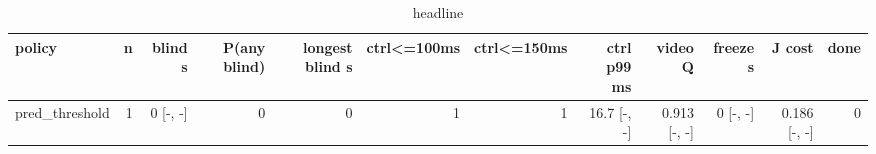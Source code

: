 \begin{table}[t]\centering\small
\begin{tabular}{lrrrrrrrrrrr}\toprule
policy & n & blind s & P(any blind) & longest blind s & ctrl<=100ms & ctrl<=150ms & ctrl p99 ms & video Q & freeze s & J cost & done \\\midrule
pred\_threshold & 1 & 0 [-, -] & 0 & 0 & 1 & 1 & 16.7 [-, -] & 0.913 [-, -] & 0 [-, -] & 0.186 [-, -] & 0 \\
\bottomrule\end{tabular}\caption{headline}\end{table}
